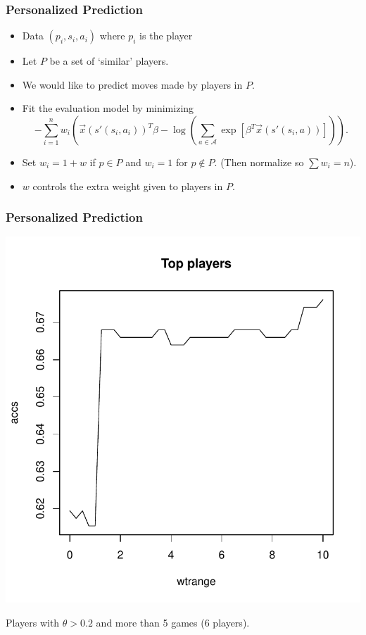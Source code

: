 \documentclass{beamer}
\begin{document}
\begin{frame}
\frametitle{Personalized Prediction}
\begin{itemize}
\item Data $(p_i, s_i, a_i)$ where $p_i$ is the player
\item Let $P$ be a set of `similar' players.
\item We would like to predict moves made by players in $P$.
\item Fit the evaluation model by minimizing
\[
-\sum_{i=1}^n w_i(\vec{x}(s'(s_i, a_i))^T \beta - \log(\sum_{a \in \mathcal{A}} \exp[\beta^T \vec{x}(s'(s_i, a))])).
\]
\item Set $w_i = 1 + w$ if $p \in P$ and $w_i = 1$ for $p \notin P$.  (Then normalize so $\sum w_i = n$).
\item $w$ controls the extra weight given to players in $P$.
\end{itemize}
\end{frame}

\begin{frame}
\frametitle{Personalized Prediction}
\begin{center}
\includegraphics[scale = 0.4]{../prediction/personalized_topplayers.pdf}
\end{center}
Players with $\theta > 0.2$ and more than 5 games (6 players).
\end{frame}
\end{document}
